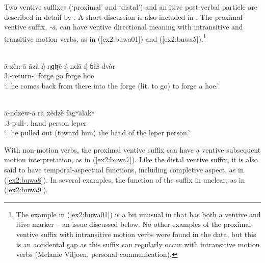 Two ventive suffixes (`proximal' and `distal') and an itive post-verbal particle are described in detail by \citet{viljoenGrammaticalDescriptionBuwal2013}. A short discussion is also included in \citet{viljoenBuwalNarrativeDiscourse2015}. The proximal ventive suffix, \textit{-ā}, can have ventive directional meaning with intransitive and transitive motion verbs, as in (\ref{ex2:buwa01}) and (\ref{ex2:buwa5}).\footnote{The example in (\ref{ex2:buwa01}) is a bit unusual in that has both a ventive and itive marker -- an issue discussed below. No other examples of the proximal ventive suffix with intransitive motion verbs were found in the data, but this is an accidental gap as this suffix can regularly occur with intransitive motion verbs (Melanie Viljoen, personal communication).}

\ea\label{ex2:buwa01}
 \\
\gll  
ā-zèn-ā āzà ŋ́ ŋɡɮē ŋ́ ndā ŋ́ ɓàɬ dvàr	\\
3.-return-.   forge  go  forge hoe	\\
\glt `...he comes back from there into the forge (lit. to go) to forge a hoe.'

\ex\label{ex2:buwa5}
 \\
\gll  ā-ndzēw-ā rā xèdzè fāgʷālākʷ	\\
.3-pull-. hand person leper		\\
\glt `...he pulled out (toward him) the hand of the leper person.'
\z 


With non-motion verbs, the proximal ventive suffix can have a ventive subsequent motion interpretation, as in (\ref{ex2:buwa7}). Like the distal ventive suffix, it is also said to have temporal-aspectual functions, including completive aspect, as in (\ref{ex2:buwa8}). In several examples, the function of the suffix in unclear, as in (\ref{ex2:buwa9}).

